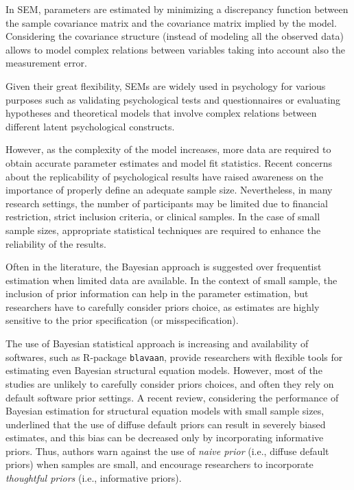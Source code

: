 \documentclass[graybox]{svmult}
\begin{document}
In SEM, parameters are estimated by minimizing a discrepancy function between the sample covariance matrix and the covariance matrix implied by the model. Considering the covariance structure (instead of modeling all the observed data) allows to model complex relations between variables taking into account also the  measurement error.


Given their great flexibility, SEMs are widely used in psychology for various purposes such as validating psychological tests and questionnaires or evaluating hypotheses and theoretical models that involve complex relations between different latent psychological constructs.

However, as the complexity of the model increases, more data are required to obtain accurate parameter estimates and model fit statistics. Recent concerns about the replicability of psychological results have raised awareness on the importance of properly define an adequate sample size.  Nevertheless, in many research settings, the number of participants may be limited due to financial restriction, strict inclusion criteria, or clinical samples. In the case of small sample sizes, appropriate statistical techniques are required to enhance the reliability of the results.

Often in the literature, the Bayesian approach is suggested over frequentist estimation when limited data are available.  In the context of small sample, the inclusion of prior information can help in the parameter estimation, but researchers have to carefully consider priors choice, as estimates are highly sensitive to the prior specification (or misspecification).

The use of Bayesian statistical approach is increasing and availability of softwares, such as R-package \texttt{blavaan},  provide researchers with flexible tools for estimating even Bayesian structural equation models. However, most of the studies are unlikely to carefully consider priors choices, and often they rely on default software prior settings. A recent review, considering the performance of Bayesian estimation for structural equation models with small sample sizes, underlined that the use of diffuse default priors can result in severely biased estimates, and this bias can be decreased only by incorporating informative priors. Thus, authors warn against the use of \emph{naive prior} (i.e., diffuse default priors) when samples are small, and encourage researchers to incorporate \emph{thoughtful priors} (i.e., informative priors).
\end{document}

